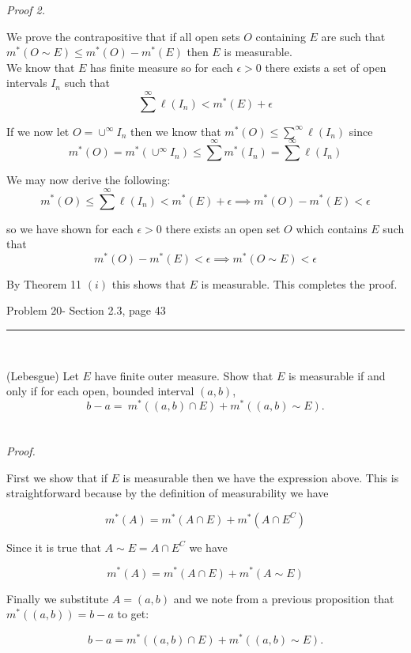 \documentclass[11pt,reqno]{article}
\begin{document}
\emph{Proof 2.}

We prove the contrapositive that if all open sets $O$ containing $E$ are such that\\ $m^*(O \sim E) \le m^*(O) - m^*(E)$ then $E$ is measurable.\\
We know that $E$ has finite measure so for each $\epsilon > 0$ there exists a set of open intervals $I_n$ such that 
\[ \sum^\infty \ell(I_n) < m^*(E) + \epsilon\]

\noindent If we now let $O = \cup^\infty I_n$ then we know that $m^*(O) \le \sum^\infty \ell(I_n)$ since 
\[ m^*(O) = m^*(  \cup^\infty I_n ) \le \sum^\infty m^*(I_n) = \sum^\infty \ell(I_n)  \]

\noindent We may now derive the following:
\[ m^*(O) \le \sum^\infty \ell(I_n) < m^*(E) + \epsilon \implies m^*(O) - m^*(E) < \epsilon \]

\noindent so we have shown for each $\epsilon > 0$ there exists an open set $O$ which contains $E$ such that 
\[ m^*(O) - m^*(E) < \epsilon \implies m^*(O \sim E) < \epsilon\]

\noindent By Theorem 11 $(i)$ this shows that $E$ is measurable. This completes the proof.

\begin{flushleft} 
Problem 20- Section 2.3, page 43\\
\rule{500pt}{1pt}\\
\end{flushleft} 

(Lebesgue) Let $E$ have finite outer measure. Show that $E$ is measurable if and only if for each open, bounded interval $(a,b)$,
\[ b - a =  \ m^*((a,b) \cap E) + m^*((a,b) \sim E). \]
\\\\ \emph{Proof.}

First we show that if $E$ is measurable then we have the expression above. This is straightforward because  by the definition of measurability we have

\[  m^*(A) = m^*(A \cap E) + m^*(A \cap E^C) \]

\noindent Since it is true that $A \sim E = A \cap E^C$ we have

\[  m^*(A) = m^*(A \cap E) + m^*(A \sim E) \]

\noindent Finally we substitute $A = (a,b)$ and we note from a previous proposition that $m^*((a,b)) = b - a$ to get:

\begin{equation} 
b - a =  m^*((a,b) \cap E) + m^*((a,b) \sim E). \label{intervalmeasure} 
\end{equation}
\end{document}
